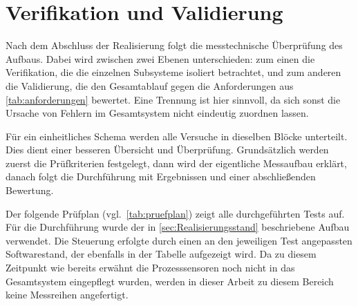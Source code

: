 \section{Verifikation und Validierung}\label{sec:ValidierungTests}
Nach dem Abschluss der Realisierung folgt die messtechnische Überprüfung des Aufbaus. Dabei wird zwischen zwei Ebenen unterschieden:
zum einen die Verifikation, die die einzelnen Subsysteme isoliert betrachtet, und zum anderen die Validierung, die den Gesamtablauf
gegen die Anforderungen aus \cref{tab:anforderungen} bewertet. Eine Trennung ist hier sinnvoll, da sich sonst die Ursache von Fehlern
im Gesamtsystem nicht eindeutig zuordnen lassen.

Für ein einheitliches Schema werden alle Versuche in dieselben Blöcke unterteilt. Dies dient einer besseren Übersicht und Überprüfung.
Grundsätzlich werden zuerst die Prüfkriterien festgelegt, dann wird der eigentliche Messaufbau erklärt, danach folgt die Durchführung mit
Ergebnissen und einer abschließenden Bewertung.

Der folgende Prüfplan (vgl.\ \cref{tab:pruefplan}) zeigt alle durchgeführten Tests auf. Für die Durchführung wurde der in
\cref{sec:Realisierungsstand} beschriebene Aufbau verwendet. Die Steuerung erfolgte durch einen an den jeweiligen Test angepassten
Softwarestand, der ebenfalls in der Tabelle aufgezeigt wird. Da zu diesem Zeitpunkt wie bereits erwähnt die Prozesssensoren noch nicht in
das Gesamtsystem eingepflegt wurden, werden in dieser Arbeit zu diesem Bereich keine Messreihen
angefertigt.

